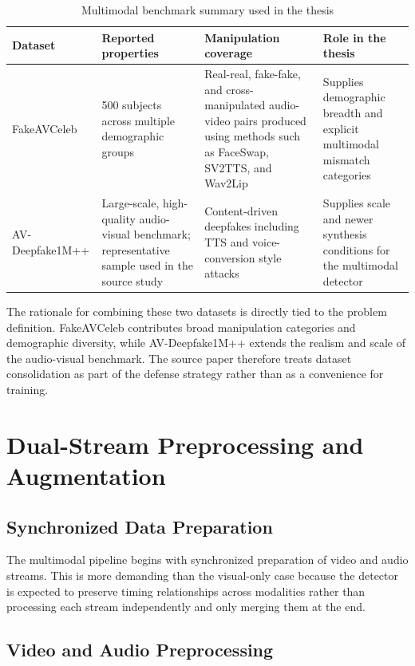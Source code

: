 \begin{table}[H]
\centering
\small
\caption{Multimodal benchmark summary used in the thesis}
\label{tab:multimodal-datasets}
\begin{tabular}{p{}p{}p{}p{}}
\toprule
\textbf{Dataset} & \textbf{Reported properties} & \textbf{Manipulation coverage} & \textbf{Role in the thesis} \\
\midrule
FakeAVCeleb & 500 subjects across multiple demographic groups & Real-real, fake-fake, and cross-manipulated audio-video pairs produced using methods such as FaceSwap, SV2TTS, and Wav2Lip & Supplies demographic breadth and explicit multimodal mismatch categories \\
AV-Deepfake1M++ & Large-scale, high-quality audio-visual benchmark; representative sample used in the source study & Content-driven deepfakes including TTS and voice-conversion style attacks & Supplies scale and newer synthesis conditions for the multimodal detector \\
\bottomrule
\end{tabular}
\end{table}

The rationale for combining these two datasets is directly tied to the problem definition. FakeAVCeleb contributes broad manipulation categories and demographic diversity, while AV-Deepfake1M++ extends the realism and scale of the audio-visual benchmark. The source paper therefore treats dataset consolidation as part of the defense strategy rather than as a convenience for training.

\section{Dual-Stream Preprocessing and Augmentation}

\subsection{Synchronized Data Preparation}

The multimodal pipeline begins with synchronized preparation of video and audio streams. This is more demanding than the visual-only case because the detector is expected to preserve timing relationships across modalities rather than processing each stream independently and only merging them at the end.

\subsection{Video and Audio Preprocessing}

